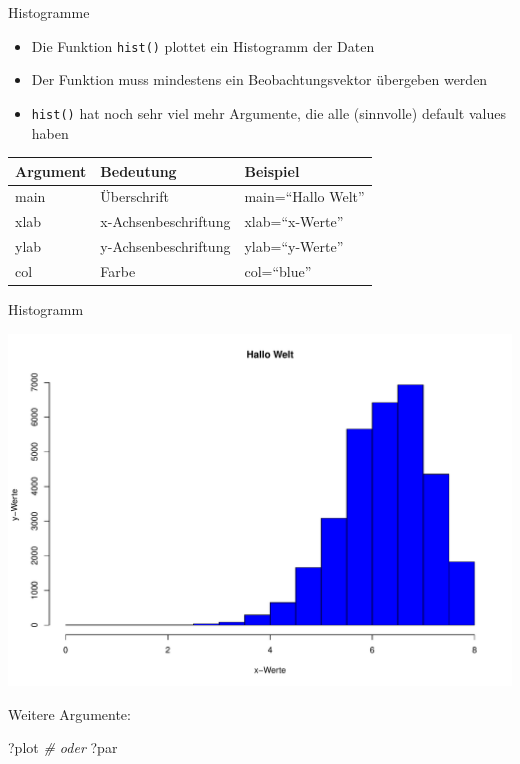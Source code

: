 \documentclass[ignorenonframetext,]{beamer}
\newenvironment{Shaded}{}{}
\newcommand{\KeywordTok}[1]{\textcolor[rgb]{0.00,0.44,0.13}{\textbf{{#1}}}}
\newcommand{\DataTypeTok}[1]{\textcolor[rgb]{0.56,0.13,0.00}{{#1}}}
\newcommand{\StringTok}[1]{\textcolor[rgb]{0.25,0.44,0.63}{{#1}}}
\newcommand{\CommentTok}[1]{\textcolor[rgb]{0.38,0.63,0.69}{\textit{{#1}}}}
\newcommand{\NormalTok}[1]{{#1}}
\providecommand{\tightlist}{%
\setlength{\itemsep}{0pt}\setlength{\parskip}{0pt}}
\begin{document}
\begin{frame}[fragile]{Histogramme}

\begin{itemize}
\tightlist
\item
  Die Funktion \texttt{hist()} plottet ein Histogramm der Daten
\item
  Der Funktion muss mindestens ein Beobachtungsvektor übergeben werden
\item
  \texttt{hist()} hat noch sehr viel mehr Argumente, die alle
  (sinnvolle) default values haben
\end{itemize}

\begin{longtable}[]{@{}lll@{}}
\toprule
Argument & Bedeutung & Beispiel\tabularnewline
\midrule
\endhead
main & Überschrift & main=``Hallo Welt''\tabularnewline
xlab & x-Achsenbeschriftung & xlab=``x-Werte''\tabularnewline
ylab & y-Achsenbeschriftung & ylab=``y-Werte''\tabularnewline
col & Farbe & col=``blue''\tabularnewline
\bottomrule
\end{longtable}

\end{frame}

\begin{frame}[fragile]{Histogramm}

\begin{Shaded}
\end{Shaded}

\includegraphics{R_intern_files/figure-beamer/unnamed-chunk-200-1.pdf}

Weitere Argumente:

\begin{Shaded}
\begin{Highlighting}[]
\NormalTok{?plot}
\CommentTok{# oder}
\NormalTok{?par}
\end{Highlighting}
\end{Shaded}

\end{frame}
\end{document}
